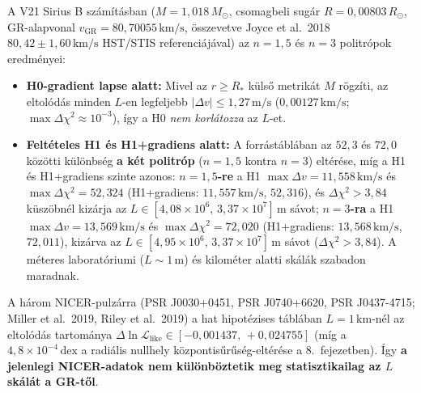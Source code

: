 \documentclass[10pt,a4paper]{article}
\begin{document}
\par
A V21 Sirius B sz\'am\'it\'asban ($M = 1{,}018\,M_\odot$, csomagbeli sug\'ar $R = 0{,}00803\,R_\odot$, GR-alapvonal $v_{\text{GR}} = 80{,}70055\,\text{km/s}$, \"osszevetve Joyce et al.\ 2018 $80{,}42 \pm 1{,}60\,\text{km/s}$ HST/STIS referenci\'aj\'aval) az $n=1{,}5$ \'es $n=3$ politr\'opok eredm\'enyei:
\begin{itemize}\setlength{\itemsep}{1.5pt}\setlength{\parskip}{0pt}\setlength{\topsep}{1pt}
  \item \textbf{H0-gradient lapse alatt:} Mivel az $r \ge R_*$ k\"uls\H{o} metrik\'at $M$ r\"ogz\'iti, az eltol\'od\'as minden $L$-en legfeljebb \textbf{$|\Delta v| \le 1{,}27\,\text{m/s}$} ($0{,}00127\,\text{km/s}$; $\max\Delta\chi^2 \approx 10^{-3}$), \'igy a H0 \emph{nem korl\'atozza} az $L$-et.
  \item \textbf{Felt\'eteles H1 \'es H1+gradiens alatt:} A forr\'ast\'abl\'aban az $52{,}3$ \'es $72{,}0$ k\"oz\"otti k\"ul\"onbs\'eg \textbf{a k\'et politr\'op} ($n=1{,}5$ kontra $n=3$) elt\'er\'ese, m\'ig a H1 \'es H1+gradiens szinte azonos: \textbf{$n=1{,}5$-re} a H1 $\max\Delta v = 11{,}558\,\text{km/s}$ \'es $\max\Delta\chi^2 = 52{,}324$ (H1+gradiens: $11{,}557\,\text{km/s}$, $52{,}316$), \'es $\Delta\chi^2 > 3{,}84$ k\"usz\"obn\'el kiz\'arja az \textbf{$L \in [4{,}08\times 10^6,\, 3{,}37\times 10^7]\,\text{m}$} s\'avot; \textbf{$n=3$-ra} a H1 $\max\Delta v = 13{,}569\,\text{km/s}$ \'es $\max\Delta\chi^2 = 72{,}020$ (H1+gradiens: $13{,}568\,\text{km/s}$, $72{,}011$), kiz\'arva az \textbf{$L \in [4{,}95\times 10^6,\, 3{,}37\times 10^7]\,\text{m}$} s\'avot ($\Delta\chi^2 > 3{,}84$). A m\'eteres laborat\'oriumi ($L \sim 1\,\text{m}$) \'es kilom\'eter alatti sk\'al\'ak szabadon maradnak.
\end{itemize}

\par
A h\'arom NICER-pulz\'arra (PSR J0030+0451, PSR J0740+6620, PSR J0437-4715; Miller et al.\ 2019, Riley et al.\ 2019) a hat hipot\'ezises t\'abl\'aban $L = 1\,\text{km}$-n\'el az eltol\'od\'as tartom\'anya \textbf{$\Delta\ln\mathcal{L}_{\text{like}} \in [-0{,}001437,\, +0{,}024755]$} (m\'ig a $4{,}8\times 10^{-4}\,\text{dex}$ a radi\'alis nullhely k\"ozpontis\H{u}r\H{u}s\'eg-elt\'er\'ese a 8.\ fejezetben). \'Igy \textbf{a jelenlegi NICER-adatok nem k\"ul\"onb\"oztetik meg statisztikailag az $L$ sk\'al\'at a GR-t\H{o}l}.
\newpage
\end{document}
